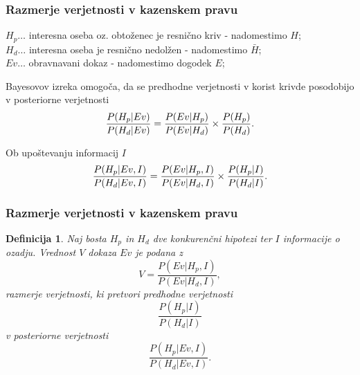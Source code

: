 \documentclass{beamer}
\newtheorem{definicija}{Definicija}
\begin{document}
\begin{frame}
    \frametitle{Razmerje verjetnosti v kazenskem pravu}
    $H_p \dots$ interesna oseba oz. obtoženec je resnično kriv - nadomestimo $H$;\\
    $H_d \dots$ interesna oseba je resnično nedolžen - nadomestimo $\bar{H}$;\\
    $Ev \dots$ obravnavani dokaz - nadomestimo dogodek $E$;\\
    \begin{block}{Bayesovov izreka omogoča, da se predhodne verjetnosti v korist krivde posodobijo v posteriorne verjetnosti}
        \[
            \frac{P(H_p \lvert Ev)}{P(H_d \lvert Ev)} = \frac{P(Ev \lvert H_p)}{P(Ev \lvert H_d)} \times \frac{P(H_p)}{P(H_d)}. \vspace{2mm}
        \]
    \end{block}\vspace{2mm}
    \begin{block}{Ob upoštevanju informacij $I$}
        \[
            \frac{P(H_p \lvert Ev, I)}{P(H_d \lvert Ev, I)} = \frac{P(Ev \lvert H_p, I)}{P(Ev \lvert H_d, I)} \times \frac{P(H_p \lvert I)}{P(H_d \lvert I)}. \vspace{2mm}
        \]
    \end{block}
\end{frame}

\begin{frame}
    \frametitle{Razmerje verjetnosti v kazenskem pravu}
    \begin{definicija}
        Naj bosta  $H_p$ in $H_d$ dve konkurenčni hipotezi ter $I$ informacije o ozadju. Vrednost $V$ dokaza $Ev$ je podana z
        \[
            V = \frac{P(Ev \lvert H_p, I)}{P(Ev \lvert H_d, I)},
        \]
        razmerje verjetnosti, ki pretvori predhodne verjetnosti
        \[
            \frac{P(H_p \lvert I)}{P(H_d \lvert I)} 
        \]
        v posteriorne verjetnosti
        \[
            \frac{P(H_p \lvert Ev, I)}{P(H_d \lvert Ev, I)}.
        \]
     \end{definicija}     
\end{frame}
\end{document}
